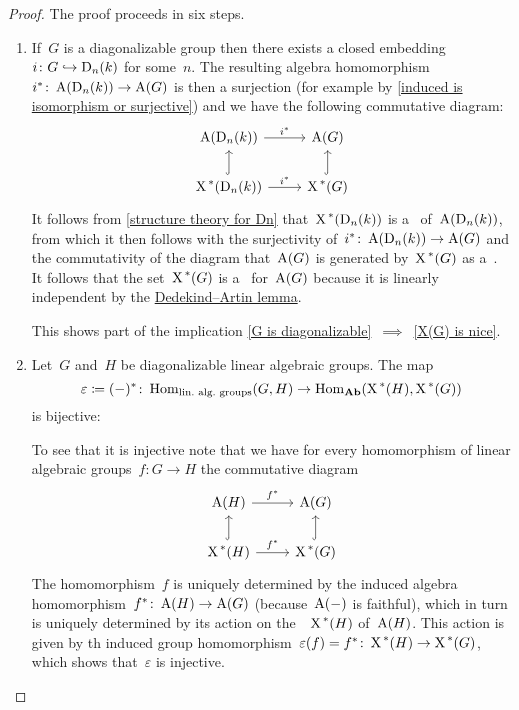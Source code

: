 \begin{proof}
  The proof proceeds in six steps.
  \begin{enumerate}[label = Step~\arabic*:]
    \item
      If~$G$ is a diagonalizable group then there exists a closed embedding~$i \colon G \hookrightarrow \operatorname{D}_n(k)$ for some~$n$.
      The resulting algebra homomorphism~$i^* \colon \operatorname{A}(\operatorname{D}_n(k)) \to \operatorname{A}(G)$ is then a surjection (for example by \cref{induced is isomorphism or surjective}) and we have the following commutative diagram:
      \[
        \begin{tikzcd}
            \coord(\Diag_n(k))
            \arrow{r}[above]{i^*}
          & \coord(G)
          \\
            \chargroup(\Diag_n(k))
            \arrow{r}[above]{i^*}
            \arrow[hook]{u}
          & \chargroup(G)
            \arrow[hook]{u}
        \end{tikzcd}
      \]
      It follows from \cref{structure theory for Dn} that~$\operatorname{X}^{\,*}(\operatorname{D}_n(k))$ is a~ of~$\operatorname{A}(\operatorname{D}_n(k))$, from which it then follows with the surjectivity of~$i^* \colon \operatorname{A}(\operatorname{D}_n(k)) \to \operatorname{A}(G)$ and the commutativity of the diagram that~$\operatorname{A}(G)$ is generated by~$\operatorname{X}^{\,*}(G)$ as a~.
      It follows that the set~$\operatorname{X}^{\,*}(G)$ is a~ for~$\operatorname{A}(G)$ because it is linearly independent by the \hyperref[dedekind artin lemma]{Dedekind\nobreakdash--Artin lemma}.
      
      This shows part of the implication \ref*{G is diagonalizable}~$\implies$~\ref*{X(G) is nice}.
      
    \item
      Let~$G$ and~$H$ be diagonalizable linear algebraic groups.
      The map
      \[
                  \varepsilon
        \coloneqq  (-)^*
        \colon    \operatorname{Hom}_{\text{lin.\ alg.\ groups}}(G, H)
        \to       \operatorname{Hom}_{\mathbf{Ab}}( \operatorname{X}^{\,*}(H), \operatorname{X}^{\,*}(G) )
      \]
      is bijective:
      
      To see that it is injective note that we have for every homomorphism of linear algebraic groups~$f \colon G \to H$ the commutative diagram
      \[
        \begin{tikzcd}
            \coord(H)
            \arrow{r}[above]{f^*}
          & \coord(G)
          \\
            \chargroup(H)
            \arrow{r}[above]{f^*}
            \arrow[hook]{u}
          & \chargroup(G)
            \arrow[hook]{u}
        \end{tikzcd}
      \]
      The homomorphism~$f$ is uniquely determined by the induced algebra homomorphism~$f^* \colon \operatorname{A}(H) \to \operatorname{A}(G)$ (because~$\operatorname{A}(-)$ is faithful), which in turn is uniquely determined by its action on the~~$\operatorname{X}^{\,*}(H)$ of~$\operatorname{A}(H)$.
      This action is given by th induced group homomorphism~$\varepsilon(f) = f^* \colon \operatorname{X}^{\,*}(H) \to \operatorname{X}^{\,*}(G)$, which shows that~$\varepsilon$ is injective.
      

\end{enumerate}
\end{proof}
